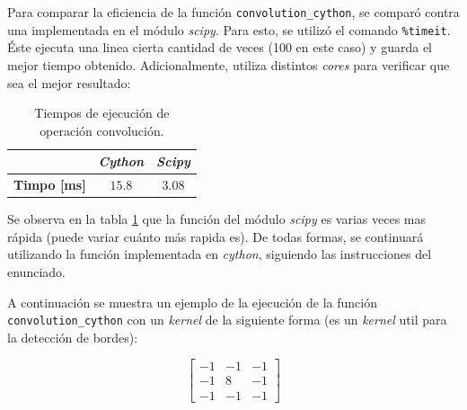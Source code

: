 \documentclass[12pt, letterpaper]{article}
\begin{document}
\par Para comparar la eficiencia de la función \texttt{convolution\_cython}, se comparó contra una implementada en el módulo \textit{scipy}. Para esto, se utilizó el comando \texttt{\%timeit}. Éste ejecuta una linea cierta cantidad de veces (100 en este caso) y guarda el mejor tiempo obtenido. Adicionalmente, utiliza distintos \textit{cores} para verificar que sea el mejor resultado: 

\begin{table}[H]
  \centering
  \begin{tabular}{|c|c|c|}
  \hline
                          & \textit{\textbf{Cython}} & \textit{\textbf{Scipy}} \\ \hline
  \textbf{Timpo {[}ms{]}} & $15.8$                     & $3.08$                    \\ \hline
  \end{tabular}
  \caption{Tiempos de ejecución de operación convolución.}
  \label{profile}
\end{table}

\par Se observa en la tabla \ref{profile} que la función del módulo \textit{scipy} es varias veces mas rápida (puede variar cuánto más rapida es). De todas formas, se continuará utilizando la función implementada en \textit{cython}, siguiendo las instrucciones del enunciado.


\par A continuación se muestra un ejemplo de la ejecución de la función \texttt{convolution\_cython} con un \textit{kernel} de la siguiente forma (es un \textit{kernel} util para la detección de bordes):

\begin{equation}
\begin{bmatrix}
-1 & -1 & -1 \\ 
-1 & 8 & -1 \\ 
-1 & -1 & -1
\end{bmatrix}
\end{equation}
\end{document}
